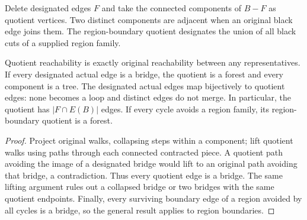 \begin{definition}
  \label{def:lowerbounds-algebraic-bridge-quotient}
  \leanok
  Delete designated edges $F$ and take the connected components of $B-F$
  as quotient vertices. Two distinct components are adjacent when an
  original black edge joins them. The region-boundary quotient designates
  the union of all black cuts of a supplied region family.
\end{definition}

\begin{theorem}
  \label{thm:lowerbounds-algebraic-bridge-quotient}
  \leanok
  Quotient reachability is exactly original reachability between any
  representatives. If every designated actual edge is a bridge, the
  quotient is a forest and every component is a tree. The designated
  actual edges map bijectively to quotient edges: none becomes a loop
  and distinct edges do not merge. In particular, the quotient has
  $|F\cap E(B)|$ edges. If every cycle avoids a region family, its
  region-boundary quotient is a forest.
\end{theorem}
\begin{proof}
  \leanok
  Project original walks, collapsing steps within a component; lift
  quotient walks using paths through each connected contracted piece.
  A quotient path avoiding the image of a designated bridge would lift
  to an original path avoiding that bridge, a contradiction. Thus every
  quotient edge is a bridge. The same lifting argument rules out a
  collapsed bridge or two bridges with the same quotient endpoints.
  Finally, every surviving boundary edge of a region avoided by all
  cycles is a bridge, so the general result applies to region boundaries.
\end{proof}

